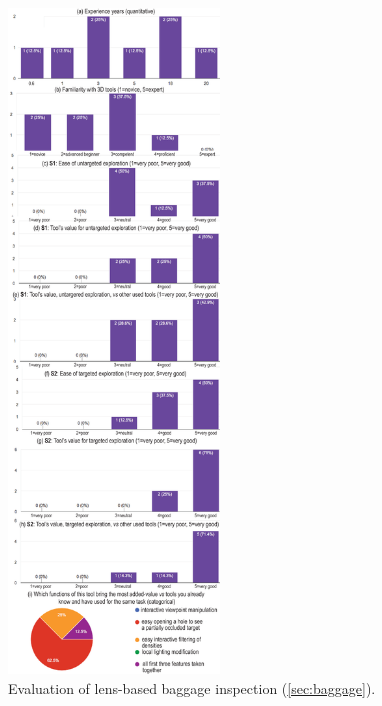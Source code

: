 \begin{figure}
\centering
\includegraphics [width=0.5\textwidth]{images/questanswers.eps}
\caption{Evaluation of lens-based baggage inspection (\autoref{sec:baggage}).}

\label{fig:questanswers}
\end{figure}

